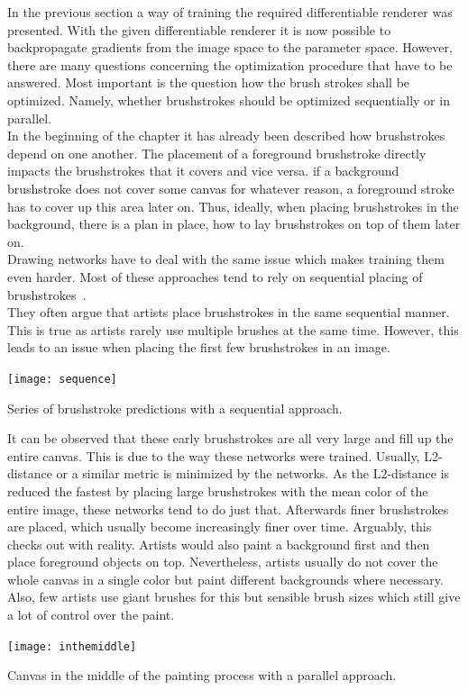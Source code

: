 In the previous section a way of training the required differentiable renderer was presented.
With the given differentiable renderer it is now possible to backpropagate gradients from the image space to the parameter space.
However, there are many questions concerning the optimization procedure that have to be answered.
Most important is the question how the brush strokes shall be optimized.
Namely, whether brushstrokes should be optimized sequentially or in parallel.\\
In the beginning of the chapter it has already been described how brushstrokes depend on one another.
The placement of a foreground brushstroke directly impacts the brushstrokes that it covers and vice versa.
\eg if a background brushstroke does not cover some canvas for whatever reason, a foreground stroke has to cover up this area later on.
Thus, ideally, when placing brushstrokes in the background, there is a plan in place, how to lay brushstrokes on top of them later on.\\
Drawing networks have to deal with the same issue which makes training them even harder.
Most of these approaches tend to rely on sequential placing of brushstrokes~\cite{SPIRAL, strokenet, learning2paint, neuralpainters, hertzmann}.\\
They often argue that artists place brushstrokes in the same sequential manner.
This is true as artists rarely use multiple brushes at the same time.
However, this leads to an issue when placing the first few brushstrokes in an image.\\
\begin{marginfigure}
    \texttt{[image: sequence]}
    \caption{Series of brushstroke predictions with a sequential approach.}
\end{marginfigure}
It can be observed that these early brushstrokes are all very large and fill up the entire canvas.
This is due to the way these networks were trained.
Usually, L2-distance or a similar metric is minimized by the networks.
As the L2-distance is reduced the fastest by placing large brushstrokes with the mean color of the entire image, these networks tend to do just that.
Afterwards finer brushstrokes are placed, which usually become increasingly finer over time.
Arguably, this checks out with reality.
Artists would also paint a background first and then place foreground objects on top.
Nevertheless, artists usually do not cover the whole canvas in a single color but paint different backgrounds where necessary.
Also, few artists use giant brushes for this but sensible brush sizes which still give a lot of control over the paint.
\begin{marginfigure}
    \texttt{[image: inthemiddle]}
    \caption{Canvas in the middle of the painting process with a parallel approach.}
\end{marginfigure}

